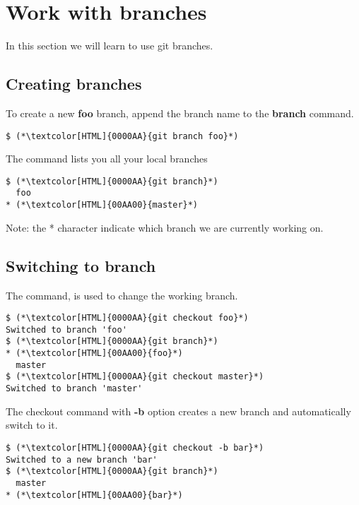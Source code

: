 \section{Work with branches}
\begin{frame}[fragile]
    \slidetitle
In this section we will learn to use git branches.

\end{frame}

\subsection{Creating branches}
\begin{frame}[fragile]
    \subslidetitle

To create a new \textbf{foo} branch, append the branch name to the \textbf{branch} command.
\begin{lstlisting}
$ (*\textcolor[HTML]{0000AA}{git branch foo}*)
\end{lstlisting}

The  command lists you all your local branches
\begin{lstlisting}
$ (*\textcolor[HTML]{0000AA}{git branch}*)
  foo
* (*\textcolor[HTML]{00AA00}{master}*)
\end{lstlisting}

Note: the * character indicate which branch we are currently working on.
\end{frame}

\subsection{Switching to branch}
\begin{frame}[fragile]
    \subslidetitle
The  command, is used to change the working branch.
\begin{lstlisting}
$ (*\textcolor[HTML]{0000AA}{git checkout foo}*)
Switched to branch 'foo'
$ (*\textcolor[HTML]{0000AA}{git branch}*)
* (*\textcolor[HTML]{00AA00}{foo}*)
  master
$ (*\textcolor[HTML]{0000AA}{git checkout master}*)
Switched to branch 'master'
\end{lstlisting}

The checkout command with \textbf{-b} option creates a new branch and automatically switch to it.
\begin{lstlisting}
$ (*\textcolor[HTML]{0000AA}{git checkout -b bar}*)
Switched to a new branch 'bar'
$ (*\textcolor[HTML]{0000AA}{git branch}*)
  master
* (*\textcolor[HTML]{00AA00}{bar}*)
\end{lstlisting}
\end{frame}

